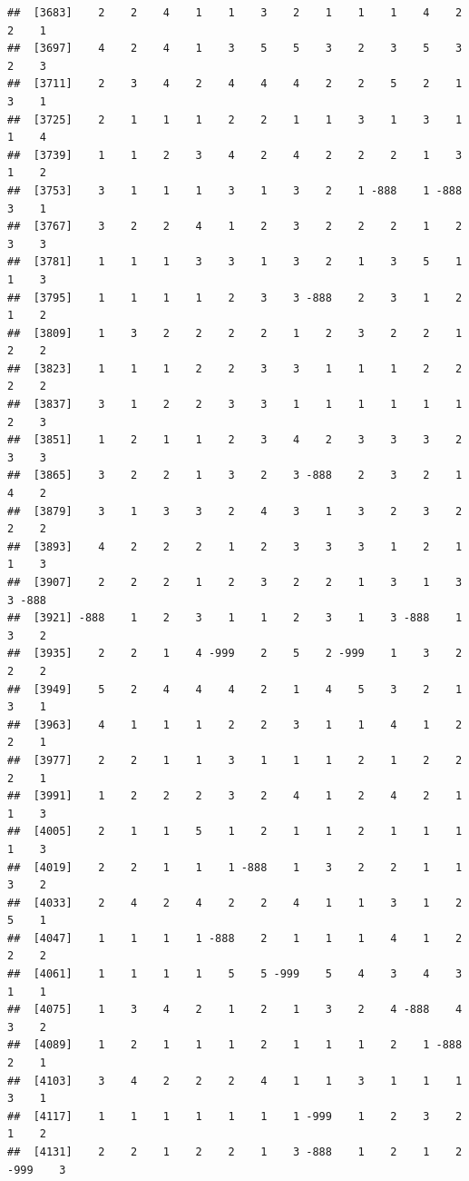 \documentclass[
  12pt,
  openany]{book}
\begin{document}
\begin{verbatim}
##  [3683]    2    2    4    1    1    3    2    1    1    1    4    2    2    1
##  [3697]    4    2    4    1    3    5    5    3    2    3    5    3    2    3
##  [3711]    2    3    4    2    4    4    4    2    2    5    2    1    3    1
##  [3725]    2    1    1    1    2    2    1    1    3    1    3    1    1    4
##  [3739]    1    1    2    3    4    2    4    2    2    2    1    3    1    2
##  [3753]    3    1    1    1    3    1    3    2    1 -888    1 -888    3    1
##  [3767]    3    2    2    4    1    2    3    2    2    2    1    2    3    3
##  [3781]    1    1    1    3    3    1    3    2    1    3    5    1    1    3
##  [3795]    1    1    1    1    2    3    3 -888    2    3    1    2    1    2
##  [3809]    1    3    2    2    2    2    1    2    3    2    2    1    2    2
##  [3823]    1    1    1    2    2    3    3    1    1    1    2    2    2    2
##  [3837]    3    1    2    2    3    3    1    1    1    1    1    1    2    3
##  [3851]    1    2    1    1    2    3    4    2    3    3    3    2    3    3
##  [3865]    3    2    2    1    3    2    3 -888    2    3    2    1    4    2
##  [3879]    3    1    3    3    2    4    3    1    3    2    3    2    2    2
##  [3893]    4    2    2    2    1    2    3    3    3    1    2    1    1    3
##  [3907]    2    2    2    1    2    3    2    2    1    3    1    3    3 -888
##  [3921] -888    1    2    3    1    1    2    3    1    3 -888    1    3    2
##  [3935]    2    2    1    4 -999    2    5    2 -999    1    3    2    2    2
##  [3949]    5    2    4    4    4    2    1    4    5    3    2    1    3    1
##  [3963]    4    1    1    1    2    2    3    1    1    4    1    2    2    1
##  [3977]    2    2    1    1    3    1    1    1    2    1    2    2    2    1
##  [3991]    1    2    2    2    3    2    4    1    2    4    2    1    1    3
##  [4005]    2    1    1    5    1    2    1    1    2    1    1    1    1    3
##  [4019]    2    2    1    1    1 -888    1    3    2    2    1    1    3    2
##  [4033]    2    4    2    4    2    2    4    1    1    3    1    2    5    1
##  [4047]    1    1    1    1 -888    2    1    1    1    4    1    2    2    2
##  [4061]    1    1    1    1    5    5 -999    5    4    3    4    3    1    1
##  [4075]    1    3    4    2    1    2    1    3    2    4 -888    4    3    2
##  [4089]    1    2    1    1    1    2    1    1    1    2    1 -888    2    1
##  [4103]    3    4    2    2    2    4    1    1    3    1    1    1    3    1
##  [4117]    1    1    1    1    1    1    1 -999    1    2    3    2    1    2
##  [4131]    2    2    1    2    2    1    3 -888    1    2    1    2 -999    3

\end{verbatim}
\end{document}
